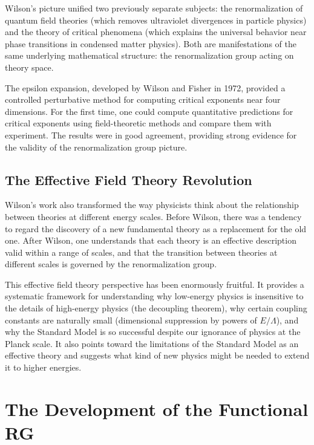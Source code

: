 \documentclass[11pt, twoside, openright]{book}
\theoremstyle{dotted}
\theoremstyle{definition}
\begin{document}
Wilson's picture unified two previously separate subjects: the renormalization
of quantum field theories (which removes ultraviolet divergences in particle physics)
and the theory of critical phenomena (which explains the universal behavior near
phase transitions in condensed matter physics). Both are manifestations of the same
underlying mathematical structure: the renormalization group acting on theory space.

The epsilon expansion, developed by Wilson and Fisher in 1972, provided a controlled
perturbative method for computing critical exponents near four dimensions. For the
first time, one could compute quantitative predictions for critical exponents using
field-theoretic methods and compare them with experiment. The results were in good
agreement, providing strong evidence for the validity of the renormalization group
picture.

\section{The Effective Field Theory Revolution}

Wilson's work also transformed the way physicists think about the relationship
between theories at different energy scales. Before Wilson, there was a tendency
to regard the discovery of a new fundamental theory as a replacement for the old
one. After Wilson, one understands that each theory is an effective description
valid within a range of scales, and that the transition between theories at different
scales is governed by the renormalization group.

This effective field theory perspective has been enormously fruitful. It provides
a systematic framework for understanding why low-energy physics is insensitive to
the details of high-energy physics (the decoupling theorem), why certain coupling
constants are naturally small (dimensional suppression by powers of $E/\Lambda$),
and why the Standard Model is so successful despite our ignorance of physics at
the Planck scale. It also points toward the limitations of the Standard Model as
an effective theory and suggests what kind of new physics might be needed to extend
it to higher energies.

\chapter{The Development of the Functional RG}
\label{ch:frg_history}
\end{document}
